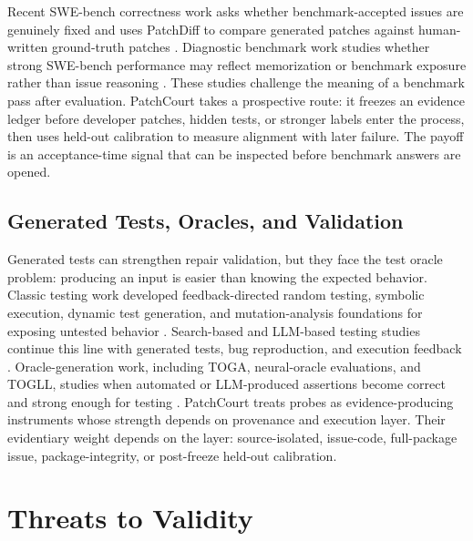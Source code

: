 \documentclass[conference]{IEEEtran}
\newcommand{\patchcourt}{PatchCourt\xspace}
\begin{document}
Recent SWE-bench correctness work asks whether benchmark-accepted issues are genuinely fixed and uses PatchDiff to compare generated patches against human-written ground-truth patches \cite{wang2025swebenchcorrectness}.
Diagnostic benchmark work studies whether strong SWE-bench performance may reflect memorization or benchmark exposure rather than issue reasoning \cite{liang2025illusion,jain2025livecodebench}.
These studies challenge the meaning of a benchmark pass after evaluation.
\patchcourt takes a prospective route: it freezes an evidence ledger before developer patches, hidden tests, or stronger labels enter the process, then uses held-out calibration to measure alignment with later failure.
The payoff is an acceptance-time signal that can be inspected before benchmark answers are opened.

\subsection{Generated Tests, Oracles, and Validation}

Generated tests can strengthen repair validation, but they face the test oracle problem: producing an input is easier than knowing the expected behavior.
Classic testing work developed feedback-directed random testing, symbolic execution, dynamic test generation, and mutation-analysis foundations for exposing untested behavior \cite{godefroid2005dart,sen2005cute,cadar2008klee,pacheco2007feedback,fraser2011evosuite,jia2011mutation}.
Search-based and LLM-based testing studies continue this line with generated tests, bug reproduction, and execution feedback \cite{lemieux2023codamosa,kang2023fewshot,chen2023codet,liu2023evalplus,ahmed2026heterogeneous,shin2026retrieval,li2026knowledge}.
Oracle-generation work, including TOGA, neural-oracle evaluations, and TOGLL, studies when automated or LLM-produced assertions become correct and strong enough for testing \cite{barr2015oracle,pezzezhang2014oracles,dinella2022toga,hossain2023neuraloracle,hossain2025togll}.
\patchcourt treats probes as evidence-producing instruments whose strength depends on provenance and execution layer.
Their evidentiary weight depends on the layer: source-isolated, issue-code, full-package issue, package-integrity, or post-freeze held-out calibration.

\section{Threats to Validity}
\end{document}
